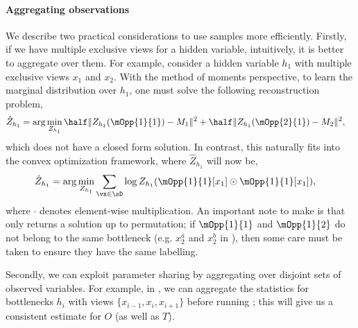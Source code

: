 \paragraph{Aggregating observations}
We describe two practical considerations to use samples more efficiently.
Firstly, if we have multiple exclusive views for a hidden variable,
  intuitively, it is better to aggregate over them. 
For example, consider a hidden variable $h_1$ with multiple exclusive
  views $x_1$ and $x_2$.
With the method of moments perspective, to learn the marginal
  distribution over $h_1$, one must solve the following reconstruction
  problem, 
\begin{align*}
  \hat Z_{h_1} &= \arg\min_{Z_{h_1}} \half \|Z_{h_1}(\mOpp{1}{1}) - M_1 \|^2 + \half \|Z_{h_1}(\mOpp{2}{1}) - M_2 \|^2,
\end{align*}
which does not have a closed form solution. 
In contrast, this naturally fits into the convex optimization framework, where $\hat Z_{h_1}$ will now be,
\begin{align*}
  \hat Z_{h_1} &= \arg\min_{Z_{h_1}} \sum_{\vx \in \sD} \log Z_{h_1}( \mOpp{1}{1}[x_1] \odot \mOpp{1}{1}[x_1] ),
\end{align*}
where $\cdot$ denotes element-wise multiplication.
An important note to make is that \TensorFactorize only returns
  a solution up to permutation; if $\mOpp{1}{1}$ and
  $\mOpp{1}{2}$ do not belong to the same bottleneck (e.g. $x^a_2$ and
  $x^b_2$ in ), then some
  care must be taken to ensure they have the same labelling.

Secondly, we can exploit parameter sharing by aggregating over
  disjoint sets of observed variables. 
For example, in , we can aggregate the statistics for
  bottlenecks $h_i$ with views $\{x_{i-1}, x_{i}, x_{i+1}\}$ before
  running \TensorFactorize; this will give us a consistent estimate for
  $O$ (as well as $T$).


